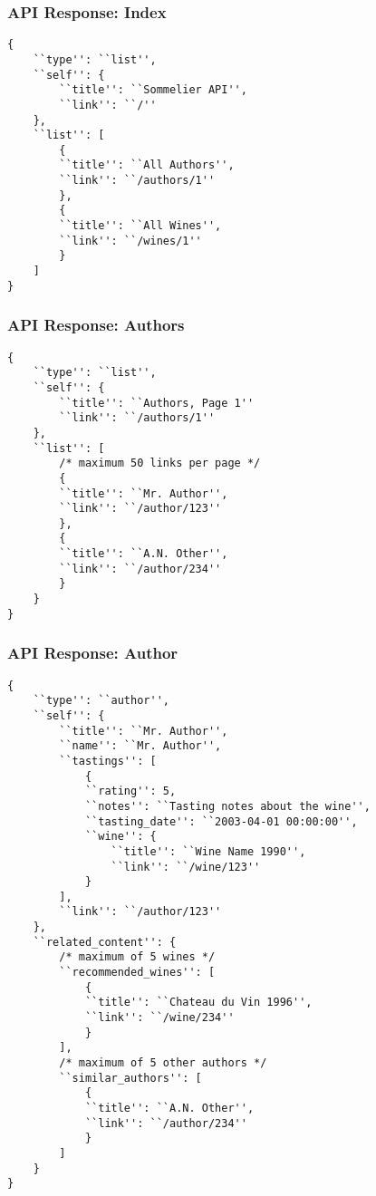 \subsubsection{API Response: Index}\label{app:apiindex}
\begin{verbatim}
{
    ``type'': ``list'',
    ``self'': {
        ``title'': ``Sommelier API'',
        ``link'': ``/''
    },
    ``list'': [
        {
        ``title'': ``All Authors'',
        ``link'': ``/authors/1''
        },
        {
        ``title'': ``All Wines'',
        ``link'': ``/wines/1''
        }
    ]
}
\end{verbatim}

\subsubsection{API Response: Authors}\label{app:apiauthors}
\begin{verbatim}
{
    ``type'': ``list'',
    ``self'': {
        ``title'': ``Authors, Page 1''
        ``link'': ``/authors/1''
    },
    ``list'': [
        /* maximum 50 links per page */
        {
        ``title'': ``Mr. Author'',
        ``link'': ``/author/123''
        },
        {
        ``title'': ``A.N. Other'',
        ``link'': ``/author/234''
        }
    }
}
\end{verbatim}
    
\subsubsection{API Response: Author}\label{app:apiauthor}
\begin{verbatim}
{
    ``type'': ``author'',
    ``self'': {
        ``title'': ``Mr. Author'',
        ``name'': ``Mr. Author'',
        ``tastings'': [
            {
            ``rating'': 5,
            ``notes'': ``Tasting notes about the wine'',
            ``tasting_date'': ``2003-04-01 00:00:00'',
            ``wine'': {
                ``title'': ``Wine Name 1990'',
                ``link'': ``/wine/123''
            }
        ],
        ``link'': ``/author/123''
    },
    ``related_content'': {
        /* maximum of 5 wines */
        ``recommended_wines'': [
            {
            ``title'': ``Chateau du Vin 1996'',
            ``link'': ``/wine/234''
            }
        ],
        /* maximum of 5 other authors */
        ``similar_authors'': [
            {
            ``title'': ``A.N. Other'',
            ``link'': ``/author/234''
            }
        ]
    }
}
\end{verbatim}

